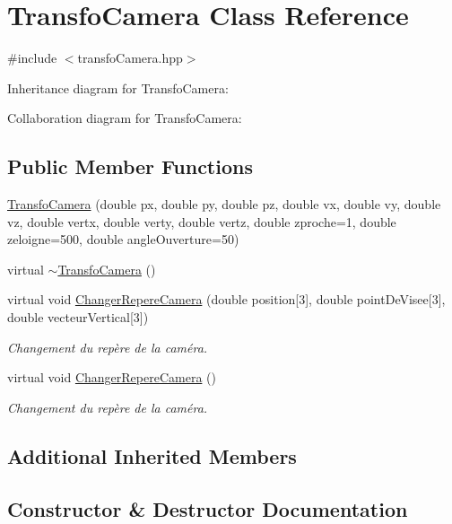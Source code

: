 \hypertarget{class_transfo_camera}{}\section{Transfo\+Camera Class Reference}
\label{class_transfo_camera}


{\ttfamily \#include $<$transfo\+Camera.\+hpp$>$}



Inheritance diagram for Transfo\+Camera\+:


Collaboration diagram for Transfo\+Camera\+:
\subsection*{Public Member Functions}
\begin{DoxyCompactItemize}
\item 
\hyperlink{class_transfo_camera_a41f26f1c44a8dfb19739bc1477a8a19e}{Transfo\+Camera} (double px, double py, double pz, double vx, double vy, double vz, double vertx, double verty, double vertz, double zproche=1, double zeloigne=500, double angle\+Ouverture=50)
\item 
virtual \hyperlink{class_transfo_camera_af1f4189a386127ee63b29b392c0a8b41}{$\sim$\+Transfo\+Camera} ()
\item 
virtual void \hyperlink{class_transfo_camera_af56c28b564652b71b7040084aaec8ff9}{Changer\+Repere\+Camera} (double position\mbox{[}3\mbox{]}, double point\+De\+Visee\mbox{[}3\mbox{]}, double vecteur\+Vertical\mbox{[}3\mbox{]})
\begin{DoxyCompactList}\small\item\em Changement du repère de la caméra. \end{DoxyCompactList}\item 
virtual void \hyperlink{class_transfo_camera_a1d02bd6398256954713d1c239d2ebcba}{Changer\+Repere\+Camera} ()
\begin{DoxyCompactList}\small\item\em Changement du repère de la caméra. \end{DoxyCompactList}\end{DoxyCompactItemize}
\subsection*{Additional Inherited Members}


\subsection{Constructor \& Destructor Documentation}
